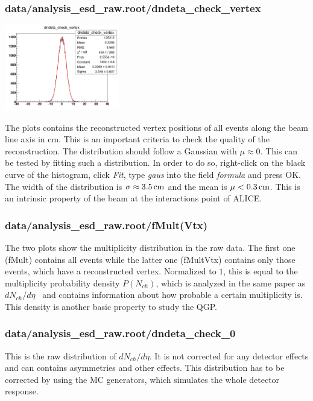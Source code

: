 \documentclass{article}
\newcommand\dNdEta{$dN_{ch}/d\eta$}
\begin{document}
\subsubsection*{data/analysis\_esd\_raw.root/dndeta\_check\_vertex}
\begin{floatingfigure}[r]{50mm}
\centering
\includegraphics[width=50mm]{images/dndeta_vertex_check.png}
\end{floatingfigure}
\noindent The plots contains the reconstructed vertex positions of all events along the beam line axis in \unit{cm}. This is an important criteria to check the quality of the reconstruction. The distribution should follow a Gaussian with $\mu \approx 0$. This can be tested by fitting such a distribution. In order to do so, right-click on the black curve of the histogram, click \textit{Fit}, type \textit{gaus} into the field \textit{formula} and press OK. The width of the distribution is $\sigma \approx \unit[3.5]{cm}$ and the mean is $\mu < \unit[0.3]{cm}$. This is an intrinsic property of the beam at the interactions point of ALICE.\\
\subsubsection*{data/analysis\_esd\_raw.root/fMult(Vtx)}
The two plots show the multiplicity distribution in the raw data. The first one (fMult) contains all events while the latter one (fMultVtx) contains only those events, which have a reconstructed vertex. Normalized to $1$, this is equal to the multiplicity probability density $P(N_{ch})$, which is analyzed in the same paper as \dNdEta~ and contains information about how probable a certain multiplicity is. This density is another basic property to study the QGP.
\subsubsection*{data/analysis\_esd\_raw.root/dndeta\_check\_0}
This is the raw distribution of \dNdEta. It is not corrected for any detector effects and can contains asymmetries and other effects. This distribution has to be corrected by using the MC generators, which simulates the whole detector response.
\end{document}
